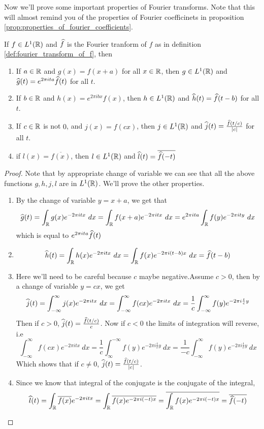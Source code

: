   Now we'll prove some important properties of Fourier transforms. Note that this will almost remind you of the properties of Fourier coefficinets in proposition \ref{prop:properties_of_fourier_coefficients}. 
  \begin{proposition}
    \label{prop:properties_of_fourier_transform}
    If $f\in L^1(\mathbb R)$ and $\widehat{f}$ is the Fourier tranform of $f$ as in definition \ref{def:fourier_transform_of_f}, then 
    \begin{enumerate}[label=(\alph*)]
      \item If $a \in \mathbb R$ and $g(x) = f(x+a)$ for all $x \in \mathbb R$, then $g \in L^1(\mathbb R)$ and $\widehat{g}(t) = e^{2\pi ita} \widehat{f}(t)$ for all $t$.
      \item If $b \in \mathbb R$ and $h(x) = e^{2\pi ibx}f(x)$, then $h \in L^1(\mathbb R)$ and $\widehat{h}(t) = \widehat{f}(t-b)$ for all $t$.
      \item If $c \in \mathbb R$ is not $0$, and $j(x) = f(cx)$, then $j \in L^1(\mathbb R)$ and $\widehat{j}(t) = \frac{\widehat{f}(t/c)}{|c|}$ for all $t$.
      \item if $l(x) = \overline{f(x)}$, then $l\in L^1(\mathbb R)$ and $\widehat{l}(t) = \overline{\widehat{f}(-t)}$
    \end{enumerate}
  \end{proposition}

  \begin{proof}
    Note that by appropriate change of variable we can see that all the above functions $g, h, j, l$ are in $L^1(\mathbb R)$. We'll prove the other properties.
    \begin{enumerate}[label=(\alph*)]
      \item By the change of variable $y = x+a$, we get that
        $$\widehat{g}(t) = \int_{\mathbb R}g(x)e^{-2 \pi itx} \ dx = \int_\mathbb R f(x+a)e^{-2\pi itx} \ dx = e^{2\pi ita}\int_\mathbb R f(y)e^{-2 \pi ity} \ dx$$
        which is equal to $e^{2\pi ita}\widehat{f}(t)$

      \item $$\widehat{h}(t) = \int_{\mathbb R}h(x)e^{-2\pi itx} \ dx = \int_\mathbb R f(x)e^{-2\pi i(t-b)x} \ dx = \widehat{f}(t-b)$$

      \item Here we'll need to be careful because $c$ maybe negative.Assume $c>0$, then by a change of variable $y=cx$, we get $$\widehat{j}(t) = \int_{-\infty}^{\infty} j(x)e^{-2\pi itx} \ dx = \int_{-\infty}^{\infty} f(cx)e^{-2\pi itx} \ dx = \frac{1}{c}\int_{-\infty}^{\infty} f(y)e^{-2\pi i \frac{t}{c}y} $$
        Then if $c>0$, $\widehat{j}(t) = \frac{\widehat{f}(t/c)}{c}$. Now if $c<0$ the limits of integration will reverse, i.e $$\int_{-\infty}^{\infty} f(cx)e^{-2\pi itx} \ dx = \frac{1}{c}\int_{\infty}^{-\infty} f(y)e^{-2\pi i \frac{t}{c}y} \ dx = \frac{1}{-c}\int_{-\infty}^{\infty} f(y)e^{-2\pi i \frac{t}{c}y} \ dx$$
        Which shows that if $c\neq 0$, $\widehat{j}(t) = \frac{\widehat{f}(t/c)}{|c|}$.
      \item Since we know that integral of the conjugate is the conjugate of the integral, $$\widehat{l}(t) = \int_\mathbb R \overline{f(x)} e^{-2\pi itx} = \int_\mathbb R \overline{f(x) e^{-2\pi i(-t)x}} = \overline{\int_\mathbb R f(x) e^{-2\pi i(-t)x}} = \overline{\widehat{f}(-t)}$$
    \end{enumerate}
  \end{proof}

